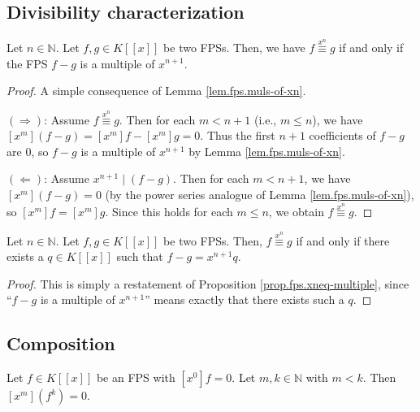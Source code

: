 \subsection{Divisibility characterization}

\begin{proposition}
\label{prop.fps.xneq-multiple}
\leantarget
\leanok
Let $n\in\mathbb{N}$. Let $f,g\in K\left[\left[x\right]\right]$ be two FPSs.
Then, we have $f\overset{x^{n}}{\equiv}g$ if and only if the FPS $f-g$ is a
multiple of $x^{n+1}$.
\end{proposition}

\begin{proof}
\leanok
A simple consequence of Lemma \ref{lem.fps.muls-of-xn}.

$(\Longrightarrow)$: Assume $f\overset{x^{n}}{\equiv}g$. Then for each
$m<n+1$ (i.e., $m\leq n$), we have $[x^m](f-g)=[x^m]f-[x^m]g=0$.
Thus the first $n+1$ coefficients of $f-g$ are $0$, so $f-g$ is a multiple
of $x^{n+1}$ by Lemma \ref{lem.fps.muls-of-xn}.

$(\Longleftarrow)$: Assume $x^{n+1}\mid(f-g)$. Then for each $m<n+1$, we have
$[x^m](f-g)=0$ (by the power series analogue of Lemma \ref{lem.fps.muls-of-xn}),
so $[x^m]f=[x^m]g$. Since this holds for each $m\leq n$, we obtain
$f\overset{x^{n}}{\equiv}g$.
\end{proof}

\begin{lemma}
\label{lem.fps.xneq-multiple.alt}
\leanhelper
\leanok
Let $n\in\mathbb{N}$. Let $f,g\in K[[x]]$ be two FPSs. Then,
$f\overset{x^{n}}{\equiv}g$ if and only if there exists a $q\in K[[x]]$
such that $f-g=x^{n+1}q$.
\end{lemma}

\begin{proof}
\leanok
This is simply a restatement of Proposition \ref{prop.fps.xneq-multiple},
since ``$f-g$ is a multiple of $x^{n+1}$'' means exactly that there exists
such a $q$.
\end{proof}

\subsection{Composition}

\begin{lemma}
\label{lem.fps.coeff-pow-zero}
\leanhelper
\leanok
Let $f\in K[[x]]$ be an FPS with $[x^0]f=0$. Let $m,k\in\mathbb{N}$ with $m<k$.
Then $[x^m](f^k)=0$.
\end{lemma}

